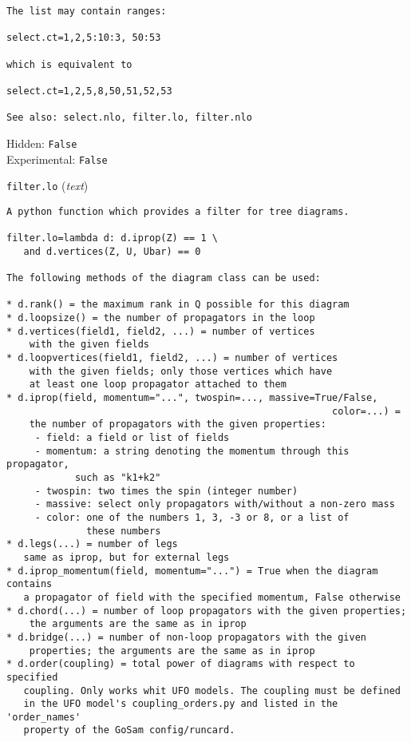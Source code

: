\begin{basedescript}{\desclabelstyle{\pushlabel}}
\begin{verbatim}
The list may contain ranges:

select.ct=1,2,5:10:3, 50:53

which is equivalent to

select.ct=1,2,5,8,50,51,52,53

See also: select.nlo, filter.lo, filter.nlo
\end{verbatim}
Hidden: \verb|False|
\\Experimental: \verb|False|
\\\item[\colorbox{gray!30}{\texttt{filter.lo}}] (\textit{text})
\begin{verbatim}
A python function which provides a filter for tree diagrams.

filter.lo=lambda d: d.iprop(Z) == 1 \
   and d.vertices(Z, U, Ubar) == 0

The following methods of the diagram class can be used:

* d.rank() = the maximum rank in Q possible for this diagram
* d.loopsize() = the number of propagators in the loop
* d.vertices(field1, field2, ...) = number of vertices
    with the given fields
* d.loopvertices(field1, field2, ...) = number of vertices
    with the given fields; only those vertices which have
    at least one loop propagator attached to them
* d.iprop(field, momentum="...", twospin=..., massive=True/False,
                                                         color=...) =
    the number of propagators with the given properties:
     - field: a field or list of fields
     - momentum: a string denoting the momentum through this propagator,
            such as "k1+k2"
     - twospin: two times the spin (integer number)
     - massive: select only propagators with/without a non-zero mass
     - color: one of the numbers 1, 3, -3 or 8, or a list of
              these numbers
* d.legs(...) = number of legs
   same as iprop, but for external legs
* d.iprop_momentum(field, momentum="...") = True when the diagram contains
   a propagator of field with the specified momentum, False otherwise
* d.chord(...) = number of loop propagators with the given properties;
    the arguments are the same as in iprop
* d.bridge(...) = number of non-loop propagators with the given
    properties; the arguments are the same as in iprop
* d.order(coupling) = total power of diagrams with respect to specified
   coupling. Only works whit UFO models. The coupling must be defined
   in the UFO model's coupling_orders.py and listed in the 'order_names'
   property of the GoSam config/runcard.


\end{verbatim}
\end{basedescript}
